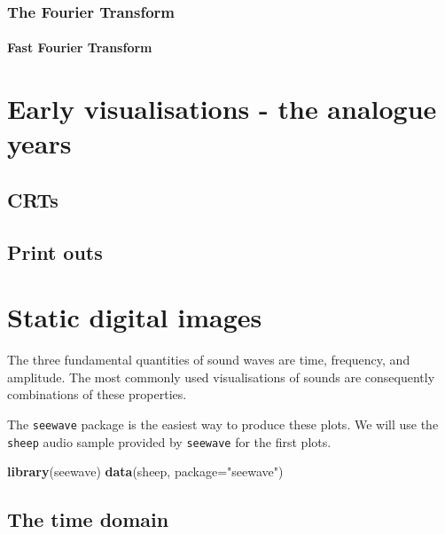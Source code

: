 \documentclass[
]{book}
\newenvironment{Shaded}{\begin{snugshade}}{\end{snugshade}}
\newcommand{\AttributeTok}[1]{\textcolor[rgb]{0.13,0.29,0.53}{#1}}
\newcommand{\FunctionTok}[1]{\textcolor[rgb]{0.13,0.29,0.53}{\textbf{#1}}}
\newcommand{\NormalTok}[1]{#1}
\newcommand{\StringTok}[1]{\textcolor[rgb]{0.31,0.60,0.02}{#1}}
\begin{document}
\hypertarget{the-fourier-transform}{%
\subsection{The Fourier Transform}\label{the-fourier-transform}}

\hypertarget{fast-fourier-transform}{%
\subsubsection{Fast Fourier Transform}\label{fast-fourier-transform}}

\hypertarget{early-viz}{%
\chapter{Early visualisations - the analogue years}\label{early-viz}}

\hypertarget{crts}{%
\section{CRTs}\label{crts}}

\hypertarget{print-outs}{%
\section{Print outs}\label{print-outs}}

\hypertarget{static-digital-images}{%
\chapter{Static digital images}\label{static-digital-images}}

The three fundamental quantities of sound waves are time, frequency, and amplitude. The most commonly used visualisations of sounds are consequently combinations of these properties.

The \texttt{seewave} package \citep{seewave} is the easiest way to produce these plots. We will use the \texttt{sheep} audio sample provided by \texttt{seewave} for the first plots.

\begin{Shaded}
\begin{Highlighting}[]
\FunctionTok{library}\NormalTok{(seewave)}
\FunctionTok{data}\NormalTok{(sheep, }\AttributeTok{package=}\StringTok{"seewave"}\NormalTok{)}
\end{Highlighting}
\end{Shaded}

\hypertarget{the-time-domain}{%
\section{The time domain}\label{the-time-domain}}
\end{document}
